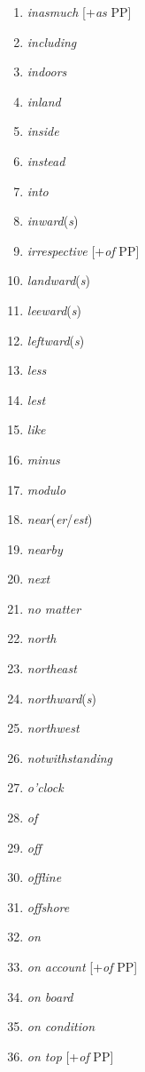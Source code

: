 \begin{multicols}{3}
\begin{enumerate}[noitemsep]
    \item \textit{inasmuch} [+\textit{as} PP]
    \item \textit{including}
    \item \textit{indoors}
    \item \textit{inland}
    \item \textit{inside}
    \item \textit{instead}
    \item \textit{into}
    \item \textit{inward}(\textit{s})
    \item \textit{irrespective} [+\textit{of} PP]
    \item \textit{landward}(\textit{s})
    \item \textit{leeward}(\textit{s})
    \item \textit{leftward}(\textit{s})
    \item \textit{less}
    \item \textit{lest}
    \item \textit{like}
    \item \textit{minus}
    \item \textit{modulo}
    \item \textit{near}(\textit{er}/\textit{est})
    \item \textit{nearby}
    \item \textit{next}
    \item \textit{no matter}
    \item \textit{north}
    \item \textit{northeast}
    \item \textit{northward}(\textit{s})
    \item \textit{northwest}
    \item \textit{notwithstanding}
    \item \textit{o'clock}
    \item \textit{of}
    \item \textit{off}
    \item \textit{offline}
    \item \textit{offshore}
    \item \textit{on}
    \item \textit{on account} [+\textit{of} PP]
    \item \textit{on board}
    \item \textit{on condition} 
    \item \textit{on top} [+\textit{of} PP]

\end{enumerate}
\end{multicols}

